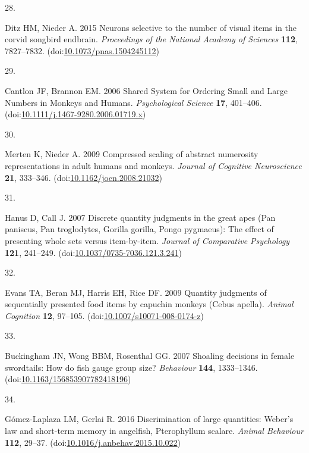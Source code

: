 \documentclass[
  ,doc,floatsintext]{apa6}
\newlength{\cslhangindent}
\newlength{\csllabelwidth}
\newlength{\cslentryspacingunit} %
\newenvironment{CSLReferences}[2] %
 {%
  \setlength{\parindent}{0pt}
  \ifodd #1
  \let\oldpar\par
  \def\par{\hangindent=\cslhangindent\oldpar}
  \fi
  \setlength{\parskip}{#2\cslentryspacingunit}
 }%
 {}
\newcommand{\CSLLeftMargin}[1]{\parbox[t]{\csllabelwidth}{#1}}
\newcommand{\CSLRightInline}[1]{\parbox[t]{\linewidth - \csllabelwidth}{#1}\break}
\begin{document}
\begin{CSLReferences}{0}{0}
\leavevmode{}%
\CSLLeftMargin{28. }%
\CSLRightInline{Ditz HM, Nieder A. 2015 Neurons selective to the number of visual items in the corvid songbird endbrain. \emph{Proceedings of the National Academy of Sciences} \textbf{112}, 7827--7832. (doi:\href{https://doi.org/10.1073/pnas.1504245112}{10.1073/pnas.1504245112})}

\leavevmode{}%
\CSLLeftMargin{29. }%
\CSLRightInline{Cantlon JF, Brannon EM. 2006 Shared {System} for {Ordering} {Small} and {Large} {Numbers} in {Monkeys} and {Humans}. \emph{Psychological Science} \textbf{17}, 401--406. (doi:\href{https://doi.org/10.1111/j.1467-9280.2006.01719.x}{10.1111/j.1467-9280.2006.01719.x})}

\leavevmode{}%
\CSLLeftMargin{30. }%
\CSLRightInline{Merten K, Nieder A. 2009 Compressed scaling of abstract numerosity representations in adult humans and monkeys. \emph{Journal of Cognitive Neuroscience} \textbf{21}, 333--346. (doi:\href{https://doi.org/10.1162/jocn.2008.21032}{10.1162/jocn.2008.21032})}

\leavevmode{}%
\CSLLeftMargin{31. }%
\CSLRightInline{Hanus D, Call J. 2007 Discrete quantity judgments in the great apes ({Pan} paniscus, {Pan} troglodytes, {Gorilla} gorilla, {Pongo} pygmaeus): {The} effect of presenting whole sets versus item-by-item. \emph{Journal of Comparative Psychology} \textbf{121}, 241--249. (doi:\href{https://doi.org/10.1037/0735-7036.121.3.241}{10.1037/0735-7036.121.3.241})}

\leavevmode{}%
\CSLLeftMargin{32. }%
\CSLRightInline{Evans TA, Beran MJ, Harris EH, Rice DF. 2009 Quantity judgments of sequentially presented food items by capuchin monkeys ({Cebus} apella). \emph{Animal Cognition} \textbf{12}, 97--105. (doi:\href{https://doi.org/10.1007/s10071-008-0174-z}{10.1007/s10071-008-0174-z})}

\leavevmode{}%
\CSLLeftMargin{33. }%
\CSLRightInline{Buckingham JN, Wong BBM, Rosenthal GG. 2007 Shoaling decisions in female swordtails: {How} do fish gauge group size? \emph{Behaviour} \textbf{144}, 1333--1346. (doi:\href{https://doi.org/10.1163/156853907782418196}{10.1163/156853907782418196})}

\leavevmode{}%
\CSLLeftMargin{34. }%
\CSLRightInline{Gómez-Laplaza LM, Gerlai R. 2016 Discrimination of large quantities: {Weber}'s law and short-term memory in angelfish, {Pterophyllum} scalare. \emph{Animal Behaviour} \textbf{112}, 29--37. (doi:\href{https://doi.org/10.1016/j.anbehav.2015.10.022}{10.1016/j.anbehav.2015.10.022})}


\end{CSLReferences}
\end{document}

